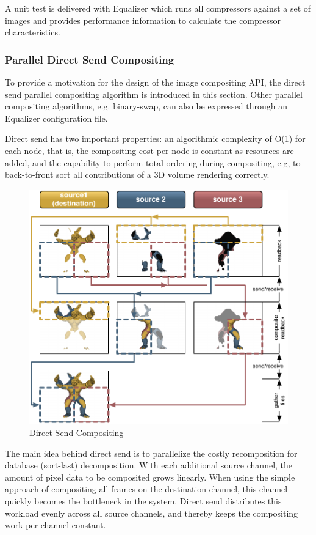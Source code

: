 \documentclass[10pt,a4]{scrartcl}
\begin{document}
A unit test is delivered with Equalizer which runs all compressors
against a set of images and provides performance information to
calculate the compressor characteristics.



\subsubsection{\label{sDirectSend}Parallel Direct Send Compositing}

To provide a motivation for the design of the image compositing
API, the direct send parallel compositing algorithm is introduced in this
section. Other parallel compositing algorithms, e.g. binary-swap, can
also be expressed through an Equalizer configuration file.

Direct send has two important properties: an algorithmic complexity of O(1) for
each node, that is, the compositing cost per node is constant as resources are
added, and the capability to perform total ordering during compositing, e.g, to
back-to-front sort all contributions of a 3D volume rendering correctly.

\begin{figure}
  \includegraphics[width=.618\textwidth]{images/directSend.pdf}
  {\caption{\label{fDirectSend}Direct Send Compositing}}
\end{figure}
The main idea behind direct send is to parallelize the costly
recomposition for database (sort-last) decomposition. With each
additional source channel, the amount of pixel data to be composited
grows linearly. When using the simple approach of compositing all frames
on the destination channel, this channel quickly becomes the bottleneck
in the system. Direct send distributes this workload evenly across all
source channels, and thereby keeps the compositing work per channel
constant.
\end{document}

